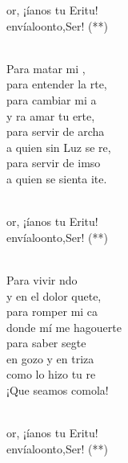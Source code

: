 \documentclass[12pt]{article}
\begin{document}
\begin{multicols*}{2}
\begin{cancion}%
	\begin{chorus}%
	or, ¡íanos tu Eritu!   \\
	envíaloonto,Ser! (**)\\
	\end{chorus}%
	\jump\\
	Para matar mi ,\\
	para entender la rte,\\
	para cambiar mi a\\
	y ra amar tu erte,\\
	para servir de archa\\
	a quien sin Luz se re,\\
	para servir de imso\\
	a quien se sienta ite. \\\jump\\
	\begin{chorus}%
	or, ¡íanos tu Eritu!   \\
	envíaloonto,Ser! (**)\\
	\end{chorus}%
	\jump\\
	Para vivir ndo\\
	y en el dolor quete,\\
	para romper mi ca\\
	donde  mí me hagouerte\\
	para saber segte\\
	en gozo y en triza\\
	como lo hizo tu re\\
	¡Que seamos comola!\\\jump\\
	\begin{chorus}%
	or, ¡íanos tu Eritu!   \\
	envíaloonto,Ser! (**)\\

\end{chorus}
\end{cancion}
\end{multicols*}
\end{document}
